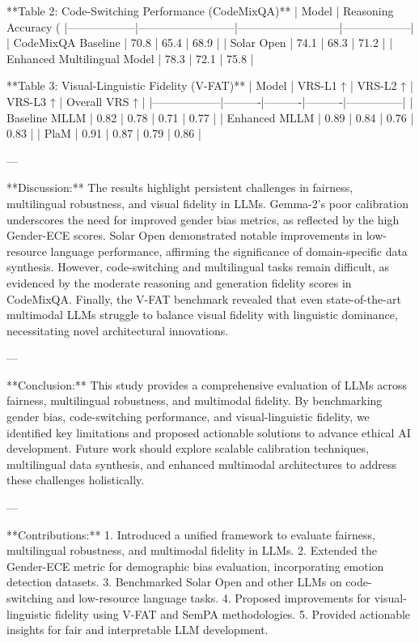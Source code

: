 **Table 2: Code-Switching Performance (CodeMixQA)**  
| Model           | Reasoning Accuracy (%
|------------------|--------------------------|---------------------------|------------------|  
| CodeMixQA Baseline | 70.8                 | 65.4                      | 68.9            |  
| Solar Open      | 74.1                    | 68.3                      | 71.2            |  
| Enhanced Multilingual Model | 78.3         | 72.1                      | 75.8            |  

**Table 3: Visual-Linguistic Fidelity (V-FAT)**  
| Model           | VRS-L1 ↑ | VRS-L2 ↑ | VRS-L3 ↑ | Overall VRS ↑ |  
|------------------|----------|----------|----------|---------------|  
| Baseline MLLM   | 0.82     | 0.78     | 0.71     | 0.77          |  
| Enhanced MLLM   | 0.89     | 0.84     | 0.76     | 0.83          |  
| PlaM            | 0.91     | 0.87     | 0.79     | 0.86          |  

---

**Discussion:**  
The results highlight persistent challenges in fairness, multilingual robustness, and visual fidelity in LLMs. Gemma-2's poor calibration underscores the need for improved gender bias metrics, as reflected by the high Gender-ECE scores. Solar Open demonstrated notable improvements in low-resource language performance, affirming the significance of domain-specific data synthesis. However, code-switching and multilingual tasks remain difficult, as evidenced by the moderate reasoning and generation fidelity scores in CodeMixQA. Finally, the V-FAT benchmark revealed that even state-of-the-art multimodal LLMs struggle to balance visual fidelity with linguistic dominance, necessitating novel architectural innovations.  

---

**Conclusion:**  
This study provides a comprehensive evaluation of LLMs across fairness, multilingual robustness, and multimodal fidelity. By benchmarking gender bias, code-switching performance, and visual-linguistic fidelity, we identified key limitations and proposed actionable solutions to advance ethical AI development. Future work should explore scalable calibration techniques, multilingual data synthesis, and enhanced multimodal architectures to address these challenges holistically.  

---

**Contributions:**  
1. Introduced a unified framework to evaluate fairness, multilingual robustness, and multimodal fidelity in LLMs.  
2. Extended the Gender-ECE metric for demographic bias evaluation, incorporating emotion detection datasets.  
3. Benchmarked Solar Open and other LLMs on code-switching and low-resource language tasks.  
4. Proposed improvements for visual-linguistic fidelity using V-FAT and SemPA methodologies.  
5. Provided actionable insights for fair and interpretable LLM development.  

